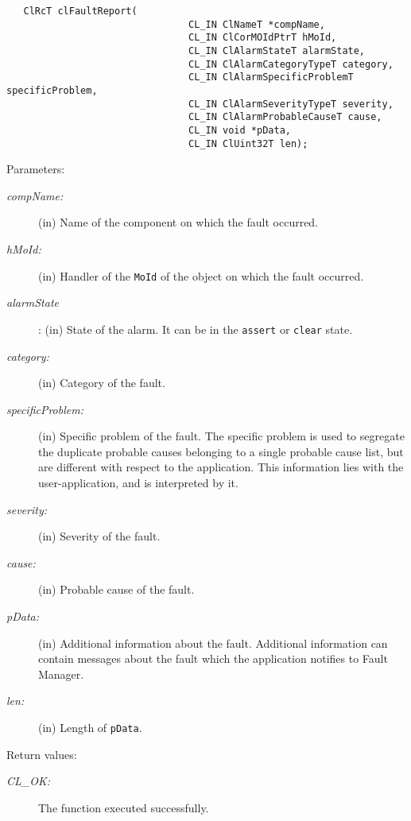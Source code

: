 \begin{flushleft}
\begin{Desc}
\footnotesize\begin{verbatim}   ClRcT clFaultReport(
                           		CL_IN ClNameT *compName,
                           		CL_IN ClCorMOIdPtrT hMoId,
                           		CL_IN ClAlarmStateT alarmState,
                           		CL_IN ClAlarmCategoryTypeT category,
                           		CL_IN ClAlarmSpecificProblemT specificProblem,
                           		CL_IN ClAlarmSeverityTypeT severity,
                           		CL_IN ClAlarmProbableCauseT cause,
                           		CL_IN void *pData,
                           		CL_IN ClUint32T len);
\end{verbatim}
\normalsize
\end{Desc}
\begin{Desc}
\item[Parameters:]
\begin{description}
\item[{\em comp\-Name:}](in) Name of the component on which the fault occurred. 
\item[{\em h\-Mo\-Id:}](in) Handler of the {\tt{MoId}} of the object 
on which the fault occurred. 
\item[{\em alarm\-State}]: (in) State of the alarm. It can be in the {\tt{assert}} or {\tt{clear}} state. 
\item[{\em category:}](in) Category of the fault. 
\item[{\em specific\-Problem:}](in) Specific problem of the fault. The specific problem is used to segregate the duplicate probable causes
belonging to a single probable cause list, but are different with respect to the application. This information lies with the user-application, and is 
interpreted by it.
\item[{\em severity:}](in) Severity of the fault. 
\item[{\em cause:}](in) Probable cause of the fault. 
\item[{\em p\-Data:}](in) Additional information about the fault. Additional information can contain messages about the fault which
the application notifies to Fault Manager. 
\item[{\em len:}](in) Length of {\tt{p\-Data}}.
\end{description}
\end{Desc}
\begin{Desc}
\item[Return values:]
\begin{description}
\item[{\em CL\_\-OK:}]The function executed successfully. 

\end{description}
\end{Desc}
\end{flushleft}
